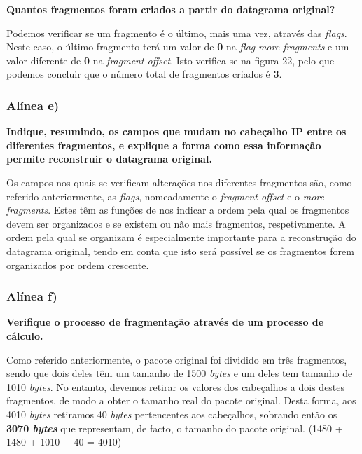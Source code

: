 \documentclass{article}
\begin{document}
\textbf{Quantos fragmentos foram criados a partir do datagrama original? }\par\vspace{0.35cm}
\hspace{0.5cm}Podemos verificar se um fragmento é o último, mais uma vez, através das \emph{flags}. Neste caso, o último fragmento terá um valor de \textbf{0} na \emph{flag} \emph{more fragments} e um valor diferente de \textbf{0} na \emph{fragment offset}. Isto verifica-se na figura 22, pelo que podemos concluir que o número total de fragmentos criados é \textbf{3}.\par\vspace{0.35cm}

\subsubsection{Alínea e)}
\textbf{Indique, resumindo, os campos que mudam no cabeçalho IP entre os diferentes fragmentos, e explique a forma como essa informação permite reconstruir o datagrama original.}

\vspace{0.35cm}

\hspace{0.5cm}Os campos nos quais se verificam alterações nos diferentes fragmentos são, como referido anteriormente, as \emph{flags}, nomeadamente o \emph{fragment offset} e o \emph{more fragments}. Estes têm as funções de nos indicar a ordem pela qual os fragmentos devem ser organizados e se existem ou não mais fragmentos, respetivamente. A ordem pela qual se organizam é especialmente importante para a reconstrução do datagrama original, tendo em conta que isto será possível se os fragmentos forem organizados por ordem crescente.\par\vspace{0.35cm}

\subsubsection{Alínea f)}
\textbf{Verifique o processo de fragmentação através de um processo de cálculo.}\par\vspace{0.35cm}

\hspace{0.5cm}Como referido anteriormente, o pacote original foi dividido em três fragmentos, sendo que dois deles têm um tamanho de 1500 \textit{bytes} e um deles tem tamanho de 1010 \textit{bytes}. No entanto, devemos retirar os valores dos cabeçalhos a dois destes fragmentos, de modo a obter o tamanho real do pacote original. Desta forma, aos 4010\textit{ bytes} retiramos 40 \textit{bytes} pertencentes aos cabeçalhos, sobrando então os \textbf{3070 \textit{bytes}} que representam, de facto, o tamanho do pacote original. (1480 + 1480 + 1010 + 40 = 4010)\par\vspace{0.35cm}
\end{document}
